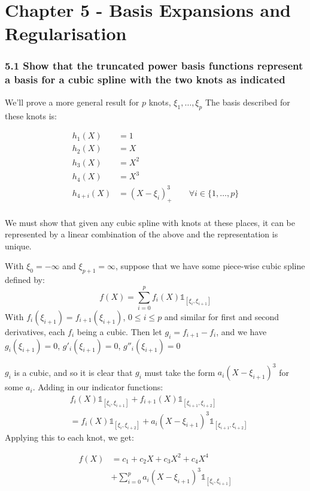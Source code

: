 
\chapter{Chapter 5 - Basis Expansions and Regularisation}

\subsection*{5.1 Show that the truncated power basis functions represent a basis for a cubic spline with the two knots as indicated}

We'll prove a more general result for $p$ knots, $\xi_1, \dots, \xi_p$
The basis described for these knots is:

\begin{align*}
    h_1(X) &= 1 \\
    h_2(X) &= X \\
    h_3(X) &= X^2 \\
    h_4(X) &= X^3 \\
    h_{4+i}(X) &= (X-\xi_i)^3_+ \hspace{2em} \forall i \in \{1,\dots,p\} \\
\end{align*}

We must show that given any cubic spline with knots at these places, it can be represented by a linear combination of the above and the representation is unique.

With $\xi_0 = -\infty$ and $\xi_{p+1} = \infty$, suppose that we have some piece-wise cubic spline defined by: 
$$f(X) = \sum_{i=0}^p f_i(X)\mathbb{1}_{[\xi_i,\xi_{i+1}]}$$
With $f_i(\xi_{i+1}) = f_{i+1}(\xi_{i+1})$, $0 \leq i \leq p$ and similar for first and second derivatives, each $f_i$ being a cubic.
Then let $g_i = f_{i+1} - f_i$, and we have $g_i(\xi_{i+1})  = 0$,  $g'_i(\xi_{i+1})  = 0$,  $g''_i(\xi_{i+1})  = 0$

$g_i$ is a cubic, and so it is clear that $g_i$ must take the form $a_i(X - \xi_{i+1})^3$ for some $a_i$. Adding in our indicator functions:
\begin{align*}
    & f_i(X)\mathbb{1}_{[\xi_i,\xi_{i+1}]} + f_{i+1}(X)\mathbb{1}_{[\xi_{i+1},\xi_{i+2}]} \\
    &=  f_{i}(X)\mathbb{1}_{[\xi_i,\xi_{i+2}]} + a_i(X - \xi_{i+1})^3\mathbb{1}_{[\xi_{i+1},\xi_{i+2}]}
\end{align*}
Applying this to each knot, we get:

\begin{align*}
    f(X) &= c_1 + c_2 X + c_3 X^2 + c_4 X^4 \\
    &+ \sum_{i=0}^p a_i (X - \xi_{i+1})^3 \mathbb{1}_{[\xi_i,\xi_{i+1}]}
\end{align*}

